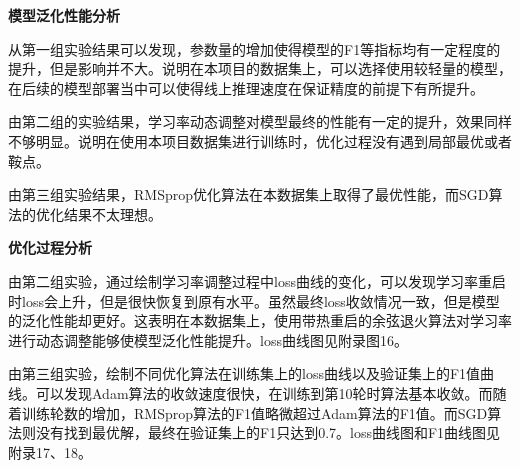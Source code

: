 \documentclass[letterpaper]{article}
\begin{document}
    \textbf{模型泛化性能分析}
    
    从第一组实验结果可以发现，参数量的增加使得模型的F1等指标均有一定程度的提升，但是影响并不大。说明在本项目的数据集上，可以选择使用较轻量的模型，在后续的模型部署当中可以使得线上推理速度在保证精度的前提下有所提升。
    
    由第二组的实验结果，学习率动态调整对模型最终的性能有一定的提升，效果同样不够明显。说明在使用本项目数据集进行训练时，优化过程没有遇到局部最优或者鞍点。
    
    由第三组实验结果，RMSprop优化算法在本数据集上取得了最优性能，而SGD算法的优化结果不太理想。

    \textbf{优化过程分析}
    
    由第二组实验，通过绘制学习率调整过程中loss曲线的变化，可以发现学习率重启时loss会上升，但是很快恢复到原有水平。虽然最终loss收敛情况一致，但是模型的泛化性能却更好。这表明在本数据集上，使用带热重启的余弦退火算法对学习率进行动态调整能够使模型泛化性能提升。loss曲线图见附录图16。

    由第三组实验，绘制不同优化算法在训练集上的loss曲线以及验证集上的F1值曲线。可以发现Adam算法的收敛速度很快，在训练到第10轮时算法基本收敛。而随着训练轮数的增加，RMSprop算法的F1值略微超过Adam算法的F1值。而SGD算法则没有找到最优解，最终在验证集上的F1只达到0.7。loss曲线图和F1曲线图见附录17、18。

\newpage
\end{document}
